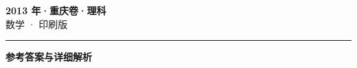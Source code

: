\documentclass[zihao=5, a4paper]{ctexart}
\begin{document}
\begin{center}
  {\Large\bfseries 2013 年·重庆卷·理科}\\[4pt]
  {\large 数学 · 印刷版}
\end{center}
\medskip
{}

\par\bigskip\hrule\bigskip
{}
\Needspace{0.55\textheight}
\begin{center}{\large\bfseries 参考答案与详细解析}\end{center}
\smallskip

\end{document}

